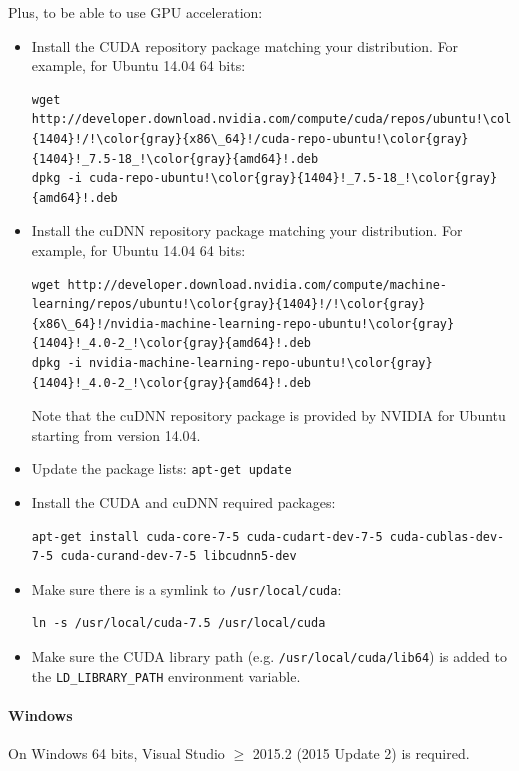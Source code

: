 \documentclass[a4paper,11pt,oneside]{article}
\newenvironment{myitemize}
{ \begin{itemize}
    \setlength{\itemsep}{0pt}
    \setlength{\parskip}{0pt}
    \setlength{\parsep}{0pt}     }
{ \end{itemize}                  }
\begin{document}
Plus, to be able to use GPU acceleration:
\begin{myitemize}
    \item Install the CUDA repository package matching your distribution. For
    example, for Ubuntu 14.04 64 bits:
\begin{lstlisting}[escapechar=!]
wget http://developer.download.nvidia.com/compute/cuda/repos/ubuntu!\color{gray}{1404}!/!\color{gray}{x86\_64}!/cuda-repo-ubuntu!\color{gray}{1404}!_7.5-18_!\color{gray}{amd64}!.deb
dpkg -i cuda-repo-ubuntu!\color{gray}{1404}!_7.5-18_!\color{gray}{amd64}!.deb
\end{lstlisting}
    \item Install the cuDNN repository package matching your distribution. For
    example, for Ubuntu 14.04 64 bits:
\begin{lstlisting}[escapechar=!]
wget http://developer.download.nvidia.com/compute/machine-learning/repos/ubuntu!\color{gray}{1404}!/!\color{gray}{x86\_64}!/nvidia-machine-learning-repo-ubuntu!\color{gray}{1404}!_4.0-2_!\color{gray}{amd64}!.deb
dpkg -i nvidia-machine-learning-repo-ubuntu!\color{gray}{1404}!_4.0-2_!\color{gray}{amd64}!.deb
\end{lstlisting}
    Note that the cuDNN repository package is provided by NVIDIA for Ubuntu starting
    from version 14.04.
    \item Update the package lists: \lstinline!apt-get update!
    \item Install the CUDA and cuDNN required packages:
\begin{lstlisting}[escapechar=!]
apt-get install cuda-core-7-5 cuda-cudart-dev-7-5 cuda-cublas-dev-7-5 cuda-curand-dev-7-5 libcudnn5-dev
\end{lstlisting}
    \item Make sure there is a symlink to \lstinline!/usr/local/cuda!:
\begin{lstlisting}[escapechar=!]
ln -s /usr/local/cuda-7.5 /usr/local/cuda
\end{lstlisting}
    \item Make sure the CUDA library path (e.g. {\tt{}/usr/local/cuda/lib64}) is
     added to the {\tt{}LD\_LIBRARY\_PATH} environment variable.
\end{myitemize}

\paragraph{Windows}

On Windows 64 bits, Visual Studio $\geq$ 2015.2 (2015 Update 2) is required.
\end{document}
